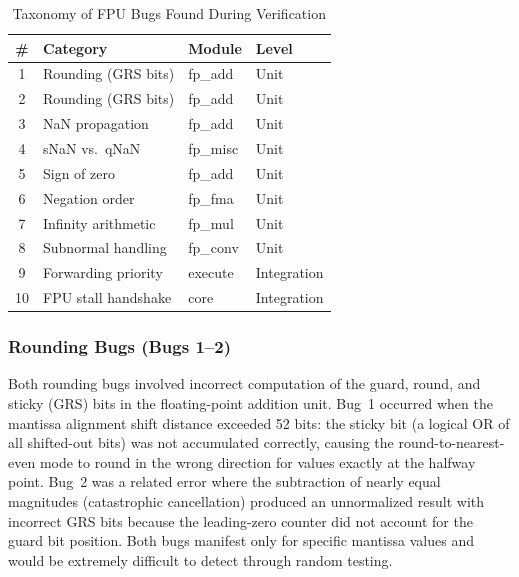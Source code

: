 \documentclass[journal]{IEEEtran}
\begin{document}
\begin{table}[!t]
\centering
\caption{Taxonomy of FPU Bugs Found During Verification}
\label{tab:bugs}
\renewcommand{\arraystretch}{1.15}
\footnotesize
\begin{tabular}{clll}
\toprule
\textbf{\#} & \textbf{Category} & \textbf{Module} & \textbf{Level} \\
\midrule
1 & Rounding (GRS bits)   & fp\_add  & Unit \\
2 & Rounding (GRS bits)   & fp\_add  & Unit \\
3 & NaN propagation       & fp\_add  & Unit \\
4 & sNaN vs.\ qNaN        & fp\_misc & Unit \\
5 & Sign of zero          & fp\_add  & Unit \\
6 & Negation order        & fp\_fma  & Unit \\
7 & Infinity arithmetic   & fp\_mul  & Unit \\
8 & Subnormal handling    & fp\_conv & Unit \\
9 & Forwarding priority   & execute  & Integration \\
10& FPU stall handshake   & core     & Integration \\
\bottomrule
\end{tabular}
\end{table}

\subsubsection{Rounding Bugs (Bugs 1--2)}
Both rounding bugs involved incorrect computation of the guard, round,
and sticky (GRS) bits in the floating-point addition unit.  Bug~1
occurred when the mantissa alignment shift distance exceeded 52 bits: the
sticky bit (a logical OR of all shifted-out bits) was not accumulated
correctly, causing the round-to-nearest-even mode to round in the wrong
direction for values exactly at the halfway point.  Bug~2 was a
related error where the subtraction of nearly equal magnitudes
(catastrophic cancellation) produced an unnormalized result with
incorrect GRS bits because the leading-zero counter did not account for
the guard bit position.  Both bugs manifest only for specific mantissa
values and would be extremely difficult to detect through random testing.
\end{document}
